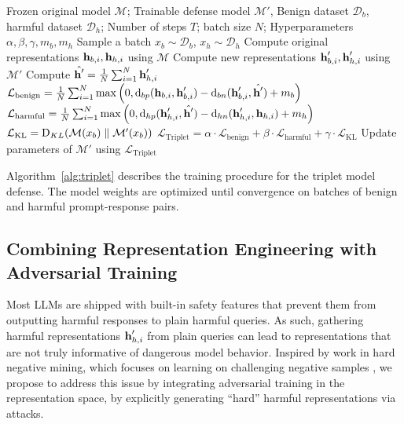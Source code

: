 \documentclass[11pt]{article}
\begin{document}
\begin{algorithm*}[htbp]
  \caption{Triplet Model Defense}
  \label{alg:triplet}
\begin{algorithmic}[1]
  \REQUIRE 
    Frozen original model $\mathcal{M}$;
    Trainable defense model $\mathcal{M}'$,
    Benign dataset $\mathcal{D}_b$, harmful dataset $\mathcal{D}_h$;
    Number of steps $T$; batch size $N$;
    Hyperparameters $\alpha, \beta, \gamma, m_b, m_h$
    \STATE Sample a batch $x_b \sim \mathcal{D}_b$, $x_h \sim \mathcal{D}_h$
    \STATE Compute original representations $\textbf{h}_{b, i}, \textbf{h}_{h, i}$ using $\mathcal{M}$
    \STATE Compute new representations $\textbf{h}^\prime_{b, i}, \textbf{h}^\prime_{h, i}$ using $\mathcal{M}'$
    \STATE Compute $\hat{\textbf{h}^\prime} = \frac{1}{N} \sum_{i=1}^{N} \textbf{h}^\prime_{h,i}$
    \STATE $\mathcal{L}_\text{benign} = \frac{1}{N} \sum_{i=1}^N \max\left(0, \text{d}_{bp}(\textbf{h}_{b,i}, \textbf{h}^\prime_{b,i}) - \text{d}_{bn}(\textbf{h}^\prime_{b,i}, \hat{\textbf{h}^\prime}) + m_b\right)$
    \STATE $\mathcal{L}_\text{harmful} = \frac{1}{N} \sum_{i=1}^N \max\left(0, \text{d}_{hp}(\textbf{h}^\prime_{h,i}, \hat{\textbf{h}^\prime}) - \text{d}_{hn}(\textbf{h}^\prime_{h,i}, \textbf{h}_{h,i}) + m_h\right)$
    \STATE $\mathcal{L}_\text{KL} = \mathrm{D}_{KL}(\mathcal{M}(x_b) \parallel \mathcal{M^\prime}(x_b))$
    \STATE $\mathcal{L}_\text{Triplet} = \alpha \cdot \mathcal{L}_\text{benign} + \beta \cdot \mathcal{L}_\text{harmful} + \gamma \cdot \mathcal{L}_\text{KL}$
    \STATE Update parameters of $\mathcal{M}'$ using $\mathcal{L}_\text{Triplet}$
  \ENDFOR
\end{algorithmic}
\end{algorithm*}

Algorithm~\ref{alg:triplet} describes the training procedure for the triplet model defense.
The model weights are optimized until convergence on batches of benign and harmful prompt-response pairs.

\newcommand{\attack}{\textit{Attack}}
\subsection{Combining Representation Engineering with Adversarial Training}


Most LLMs are shipped with built-in safety features that prevent them from outputting harmful responses to plain harmful queries.
As such, gathering harmful representations $\textbf{h}^\prime_{h,i}$ from plain queries can lead to representations that are not truly informative
of dangerous model behavior. Inspired by work in hard negative mining, which focuses on learning on challenging negative samples \citep{robinson2021contrastivelearninghardnegative}, we propose to address this issue by integrating adversarial training in the representation space, by explicitly generating ``hard'' harmful representations via attacks.
\end{document}
